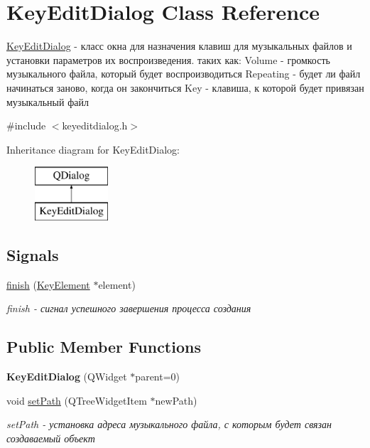\hypertarget{class_key_edit_dialog}{}\section{Key\+Edit\+Dialog Class Reference}
\label{class_key_edit_dialog}


\hyperlink{class_key_edit_dialog}{Key\+Edit\+Dialog} -\/ класс окна для назначения клавиш для музыкальных файлов и установки параметров их воспроизведения. таких как\+: Volume -\/ громкость музыкального файла, который будет воспроизводиться Repeating -\/ будет ли файл начинаться заново, когда он закончиться Key -\/ клавиша, к которой будет привязан музыкальный файл  




{\ttfamily \#include $<$keyeditdialog.\+h$>$}

Inheritance diagram for Key\+Edit\+Dialog\+:\begin{figure}[H]
\begin{center}
\leavevmode
\includegraphics[height=2.000000cm]{class_key_edit_dialog}
\end{center}
\end{figure}
\subsection*{Signals}
\begin{DoxyCompactItemize}
\item 
\hyperlink{class_key_edit_dialog_a97e7fe242369a04650fea473fb1d68a4}{finish} (\hyperlink{class_key_element}{Key\+Element} $\ast$element)
\begin{DoxyCompactList}\small\item\em finish -\/ сигнал успешного завершения процесса создания \end{DoxyCompactList}\end{DoxyCompactItemize}
\subsection*{Public Member Functions}
\begin{DoxyCompactItemize}
\item 
\mbox{\label{class_key_edit_dialog_ad71e9b9fec5ecb5fc89010dd17b60478}} 
{\bfseries Key\+Edit\+Dialog} (Q\+Widget $\ast$parent=0)
\item 
void \hyperlink{class_key_edit_dialog_a88b517565674d5112be255d7f0808efe}{set\+Path} (Q\+Tree\+Widget\+Item $\ast$new\+Path)
\begin{DoxyCompactList}\small\item\em set\+Path -\/ установка адреса музыкального файла, с которым будет связан создаваемый объект \end{DoxyCompactList}\end{DoxyCompactItemize}


